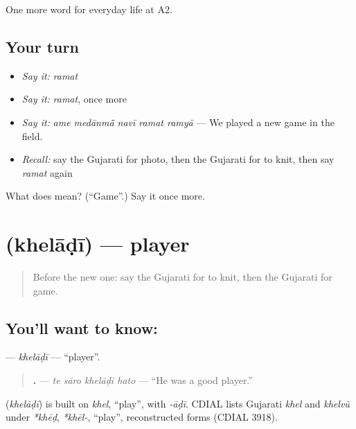 \begin{grammarlens}[title={What you've built}]
One more word for everyday life at A2.
\end{grammarlens}

\subsection*{Your turn}
\begin{itemize}
\raggedright
  \item \emph{Say it:} \emph{ramat}
  \item \emph{Say it:} \emph{ramat}, once more
  \item \emph{Say it:} \emph{ame medānmā̃ navī ramat ramyā} — We played a new game in the field.
  \item \emph{Recall:} say the Gujarati for photo, then the Gujarati for to knit, then say \emph{ramat} again
\end{itemize}

\begin{tcolorbox}[breakable,colback=teal!4,colframe=teal!35!black,title={Before you move on}]
What does  mean? (\textquotedblleft{}Game\textquotedblright{}.) Say it once more.
\end{tcolorbox}
\section[\texorpdfstring{\gu{ખેલાડી} (khelāḍī)}{ખેલાડી (khelāḍī)}]{ (khelāḍī) — player}

\label{lesson:GU-C257-kheladi}



\begin{quote}
Before the new one: say the Gujarati for to knit, then the Gujarati for game.
\end{quote}

\subsection*{You'll want to know: }
\textbf{} — \emph{khelāḍī} — \textquotedblleft{}player\textquotedblright{}.

\begin{quote}
\textbf{   .} — \emph{te sāro khelāḍī hato} — \textquotedblleft{}He was a good player.\textquotedblright{}
\end{quote}

\begin{cousinweb}
\textbf{} (\emph{khelāḍī}) is built on \emph{khel}, \textquotedblleft{}play\textquotedblright{}, with \emph{-āḍī}. CDIAL lists Gujarati \emph{khel} and \emph{khelvũ} under \emph{*khēḍ}, \emph{*khēl-}, \textquotedblleft{}play\textquotedblright{}, reconstructed forms (CDIAL 3918).
\end{cousinweb}

